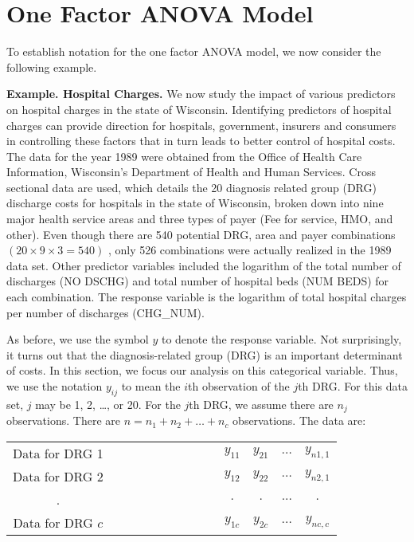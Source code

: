 \section{One Factor ANOVA Model}

To establish notation for the one factor ANOVA model, we now
consider the following example.

\linejed

\textbf{Example. Hospital Charges.} We
now study the impact of various predictors on hospital charges in
the state of Wisconsin. Identifying predictors of hospital charges
can provide direction for hospitals, government, insurers and
consumers in controlling these factors that in turn leads to better
control of hospital costs. The data for the year 1989 were obtained
from the Office of Health Care Information, Wisconsin's Department
of Health and Human Services. Cross sectional data are used, which
details the 20 diagnosis related group (DRG) discharge costs for
hospitals in the state of Wisconsin, broken down into nine major
health service areas and three types of payer (Fee for service, HMO,
and other). Even though there
are 540 potential DRG, area and payer combinations $(20\times 9\times 3=540)$%
, only 526 combinations were actually realized in the 1989 data set. Other
predictor variables included the logarithm of the total number of discharges
(NO DSCHG) and total number of hospital beds (NUM BEDS) for each
combination. The response variable is the logarithm of total hospital
charges per number of discharges (CHG\_NUM).

As before, we use the symbol $y$ to denote the response variable.
Not surprisingly, it turns out that the diagnosis-related group
(DRG) is an important determinant of costs. In this section, we
focus our analysis on this categorical variable. Thus, we use the
notation $y_{ij}$ to mean the $i$th observation of the $j$th DRG.
For this data set, $j$ may be 1, 2, \ldots , or 20. For the $j$th
DRG, we assume there are $n_{j}$ observations. There are
$n=n_1+n_2+\ldots +n_{c}$ observations. The data are:

\begin{center}
\begin{tabular}{cccccc}
Data for DRG 1 & \ \ \ \ \ \ \ \ \ \ \ \ \ \ \  & $y_{11}$ & $y_{21}$ & $%
\ldots $ & $y_{n1,1}$ \\
Data for DRG 2 &  & $y_{12}$ & $y_{22}$ & $\ldots $ & $y_{n2,1}$ \\
. &  & $.$ & $.$ & $...$ & $.$ \\
Data for DRG $c$ &  & $y_{1c}$ & $y_{2c}$ & $\ldots $ & $y_{nc,c}$%
\end{tabular}
\end{center}

